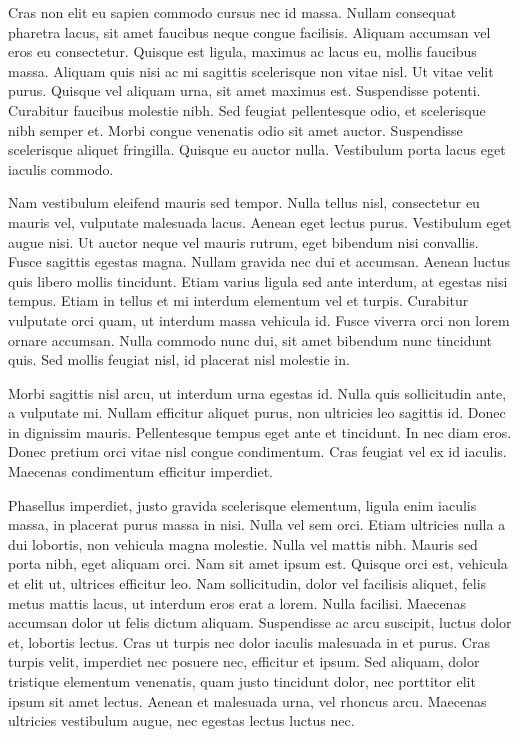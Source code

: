 Cras non elit eu sapien commodo cursus nec id massa. Nullam consequat pharetra lacus, sit amet faucibus neque congue facilisis. Aliquam accumsan vel eros eu consectetur. Quisque est ligula, maximus ac lacus eu, mollis faucibus massa. Aliquam quis nisi ac mi sagittis scelerisque non vitae nisl. Ut vitae velit purus. Quisque vel aliquam urna, sit amet maximus est. Suspendisse potenti. Curabitur faucibus molestie nibh. Sed feugiat pellentesque odio, et scelerisque nibh semper et. Morbi congue venenatis odio sit amet auctor. Suspendisse scelerisque aliquet fringilla. Quisque eu auctor nulla. Vestibulum porta lacus eget iaculis commodo.

Nam vestibulum eleifend mauris sed tempor. Nulla tellus nisl, consectetur eu mauris vel, vulputate malesuada lacus. Aenean eget lectus purus. Vestibulum eget augue nisi. Ut auctor neque vel mauris rutrum, eget bibendum nisi convallis. Fusce sagittis egestas magna. Nullam gravida nec dui et accumsan. Aenean luctus quis libero mollis tincidunt. Etiam varius ligula sed ante interdum, at egestas nisi tempus. Etiam in tellus et mi interdum elementum vel et turpis. Curabitur vulputate orci quam, ut interdum massa vehicula id. Fusce viverra orci non lorem ornare accumsan. Nulla commodo nunc dui, sit amet bibendum nunc tincidunt quis. Sed mollis feugiat nisl, id placerat nisl molestie in.

Morbi sagittis nisl arcu, ut interdum urna egestas id. Nulla quis sollicitudin ante, a vulputate mi. Nullam efficitur aliquet purus, non ultricies leo sagittis id. Donec in dignissim mauris. Pellentesque tempus eget ante et tincidunt. In nec diam eros. Donec pretium orci vitae nisl congue condimentum. Cras feugiat vel ex id iaculis. Maecenas condimentum efficitur imperdiet.

Phasellus imperdiet, justo gravida scelerisque elementum, ligula enim iaculis massa, in placerat purus massa in nisi. Nulla vel sem orci. Etiam ultricies nulla a dui lobortis, non vehicula magna molestie. Nulla vel mattis nibh. Mauris sed porta nibh, eget aliquam orci. Nam sit amet ipsum est. Quisque orci est, vehicula et elit ut, ultrices efficitur leo. Nam sollicitudin, dolor vel facilisis aliquet, felis metus mattis lacus, ut interdum eros erat a lorem. Nulla facilisi. Maecenas accumsan dolor ut felis dictum aliquam. Suspendisse ac arcu suscipit, luctus dolor et, lobortis lectus. Cras ut turpis nec dolor iaculis malesuada in et purus. Cras turpis velit, imperdiet nec posuere nec, efficitur et ipsum. Sed aliquam, dolor tristique elementum venenatis, quam justo tincidunt dolor, nec porttitor elit ipsum sit amet lectus. Aenean et malesuada urna, vel rhoncus arcu. Maecenas ultricies vestibulum augue, nec egestas lectus luctus nec.

